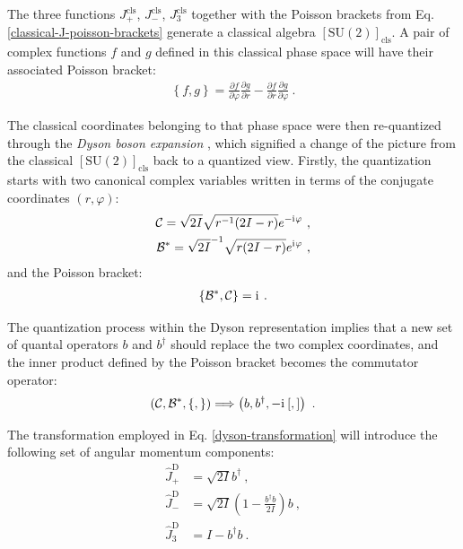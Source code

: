 The three functions $J_+^\text{cls}$, $J_-^\text{cls}$, $J_3^\text{cls}$ together with the Poisson brackets from Eq. \ref{classical-J-poisson-brackets} generate a classical algebra $\left[\text{SU}(2)\right]_\text{cls}$. A pair of complex functions $f$ and $g$ defined in this classical phase space will have their associated Poisson bracket:
\begin{align}
    \left\{f,g\right\}=\frac{\partial f}{\partial \varphi}\frac{\partial g}{\partial r} - \frac{\partial f}{\partial r}\frac{\partial g}{\partial \varphi}\ .
\end{align} 

The classical coordinates belonging to that phase space were then re-quantized through the \emph{Dyson boson expansion} \cite{dyson1956general}, which signified a change of the picture from the classical $\left[\text{SU}(2)\right]_\text{cls}$ back to a quantized view. Firstly, the quantization starts with two canonical complex variables written in terms of the conjugate coordinates $(r, \varphi)$:
\begin{align}
    \mathcal{C}=\sqrt{2I}\sqrt{r^{-1}(2I-r)}e^{-\iu\varphi}\ ,\nonumber\\
    \mathcal{B}^*=\sqrt{2I}^{-1}\sqrt{r(2I-r)}e^{\iu\varphi}\ ,
    \label{complex-variables-dyson}
\end{align}
and the Poisson bracket:
\begin{align}
    \left\{\mathcal{B}^*,\mathcal{C}\right\}=\mathrm{i}\mkern1mu\ .
\end{align}

The quantization process within the Dyson representation implies that a new set of quantal operators $b$ and $b^\dagger$ should replace the two complex coordinates, and the inner product defined by the Poisson bracket becomes the commutator operator:
\begin{align}
    \left(\mathcal{C},\mathcal{B}^*,\{,\}\right)\Longrightarrow\left(b,b^\dagger,-\mathrm{i}\mkern1mu \left[,\right]\right)\ .
    \label{dyson-transformation}
\end{align} 

The transformation employed in Eq. \ref{dyson-transformation} will introduce the following set of angular momentum components:
\begin{align}
    \hat{J}_+^\text{D}&=\sqrt{2I}b^\dagger\ ,\nonumber\\
    \hat{J}_-^\text{D}&=\sqrt{2I}\left(1-\frac{b^\dagger b}{2I}\right)b\ ,\nonumber\\
    \hat{J}_3^\text{D}&=I-b^\dagger b\ .
    \label{dyson-boson-expansion-am-components}
\end{align}

